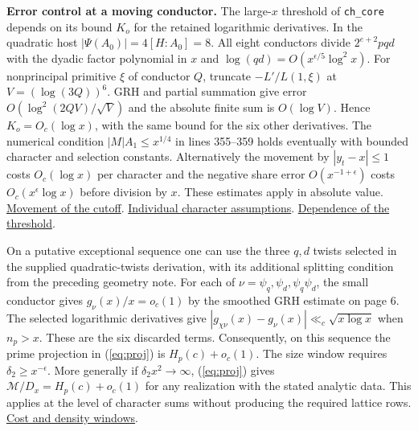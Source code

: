 \documentclass[11pt]{article}
\newcommand{\base}{https://github.com/Deicyde/riemann-hypothesis/blob/e7c8972c701d3396947808ab20cc16dc14623d33/src/}
\newcommand{\pin}[3]{\href{\base#1.lean\##2}{#3}}
\newcommand{\landdir}{Development/AutomorphicArithmetic/DedekindLFunctions/LandauTheorems/}
\newcommand{\sz}{Formalism/SizeWindowBrackets/}
\begin{document}
\textbf{Error control at a moving conductor.}
The large-$x$ threshold of \texttt{ch\_core} depends on its bound $K_o$ for the retained logarithmic derivatives. In the quadratic host $|\Psi(A_0)|=4[H:A_0]=8$.
All eight conductors divide $2^{e+2}pqd$ with the dyadic factor polynomial in $x$ and $\log(qd)=O(x^{\epsilon/5}\log^2 x)$. For nonprincipal primitive $\xi$ of conductor $Q$, truncate $-L'/L(1,\xi)$ at $V=(\log(3Q))^6$. GRH and partial summation give error $O(\log^2(2QV)/\sqrt V)$ and the absolute finite sum is $O(\log V)$. Hence $K_o=O_c(\log x)$, with the same bound for the six other derivatives. The numerical condition $|M|A_1\le x^{1/4}$ in lines 355--359 holds eventually with bounded character and selection constants. Alternatively the movement by $|y_t-x|\le1$ costs $O_c(\log x)$ per character and the negative share error $O(x^{-1+\epsilon})$ costs $O_c(x^{\epsilon}\log x)$ before division by $x$. These estimates apply in absolute value.
\pin{\landdir ChCore}{L154-L179}{Movement of the cutoff}.
\pin{\landdir ChCore}{L202-L212}{Individual character assumptions}.
\pin{\landdir ChCore}{L342-L359}{Dependence of the threshold}.

On a putative exceptional sequence one can use the three $q,d$ twists selected in the supplied quadratic-twists derivation, with its additional splitting condition from the preceding geometry note. For each of $\nu=\psi_q,\psi_d,\psi_q\psi_d$, the small conductor gives $g_\nu(x)/x=o_c(1)$ by the smoothed GRH estimate on page 6.
The selected logarithmic derivatives give $|g_{\chi\nu}(x)-g_\nu(x)|\ll_c\sqrt{x\log x}$ when $n_p>x$. These are the six discarded terms. Consequently, on this sequence the prime projection in (\ref{eq:proj}) is $H_p(c)+o_c(1)$. The size window requires $\delta_2\ge x^{-\epsilon}$. More generally if $\delta_2 x^2\to\infty$, (\ref{eq:proj}) gives $\mathcal M/D_x=H_p(c)+o_c(1)$ for any realization with the stated analytic data. This applies at the level of character sums without producing the required lattice rows. \pin{\sz SChain}{L50-L59}{Cost and density windows}.

\newpage
\end{document}
